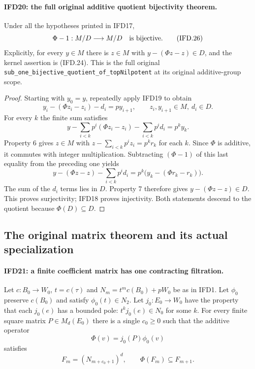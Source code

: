\documentclass[11pt,a4paper]{article}
\numberwithin{equation}{section}
\theoremstyle{remark}\newtheorem{remark}[theorem]{Remark}
\begin{document}
\paragraph{IFD20: the full original additive quotient bijectivity theorem.}
\label{claim:IFD20}
Under all the hypotheses printed in IFD17,
\[
                         \Phi-1:M/D\longrightarrow M/D
                                      \quad\hbox{is bijective}.       \tag{IFD.26}
\]
Explicitly, for every $y\in M$ there is $z\in M$ with
$y-(\Phi z-z)\in D$, and the kernel assertion is (IFD.24).
This is the full original
\texttt{sub\_\allowbreak one\_\allowbreak bijective\_\allowbreak quotient\_\allowbreak of\_\allowbreak top\allowbreak Nilpotent}
at its original additive-group scope.

\begin{proof}
Starting with $y_0=y$, repeatedly apply IFD19 to obtain
\[
                  y_i-(\Phi z_i-z_i)-d_i=p y_{i+1},
                   \qquad z_i,y_{i+1}\in M,\ d_i\in D.
\]
For every $k$ the finite sum satisfies
\[
 y-\sum_{i<k}p^i(\Phi z_i-z_i)-\sum_{i<k}p^id_i=p^ky_k.
\]
Property 6 gives $z\in M$ with
$z-\sum_{i<k}p^iz_i=p^kr_k$ for each $k$.
Since $\Phi$ is additive, it commutes with integer multiplication.
Subtracting $(\Phi-1)$ of this last equality from the preceding
one yields
\[
 y-(\Phi z-z)-\sum_{i<k}p^id_i
                         =p^k\bigl(y_k-(\Phi r_k-r_k)\bigr).
\]
The sum of the $d_i$ terms lies in $D$. Property 7 therefore gives
$y-(\Phi z-z)\in D$. This proves surjectivity; IFD18 proves
injectivity. Both statements descend to the quotient because
$\Phi(D)\subseteq D$.
\end{proof}

\subsection{The original matrix theorem and its actual specialization}

\paragraph{IFD21: a finite coefficient matrix has one contracting filtration.}
\label{claim:IFD21}
Let $c:B_0\to W_0$, $t=c(\tau)$ and $N_m=t^mc(B_0)+pW_0$
be as in IFD1. Let $\phi_0$ preserve $c(B_0)$ and satisfy
$\phi_0(t)\in N_2$. Let $j_0:E_0\to W_0$ have the property
that each $j_0(e)$ has a bounded pole:
$t^kj_0(e)\in N_0$ for some $k$.
For every finite square matrix $P\in M_d(E_0)$ there is a
single $c_0\geq0$ such that the additive operator
\[
                   \Phi(v)=j_0(P)\phi_0(v)
\]
satisfies
\[
 F_m=(N_{m+c_0+1})^d,\qquad \Phi(F_m)\subseteq F_{m+1}.
                                                               \tag{IFD.27}
\]
\end{document}
